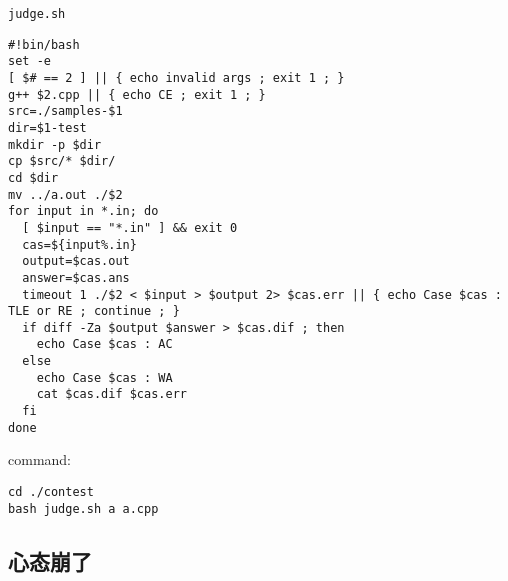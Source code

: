\documentclass[]{article}
\begin{document}
\texttt{judge.sh}

\begin{verbatim}
#!bin/bash
set -e
[ $# == 2 ] || { echo invalid args ; exit 1 ; }
g++ $2.cpp || { echo CE ; exit 1 ; }
src=./samples-$1
dir=$1-test
mkdir -p $dir
cp $src/* $dir/ 
cd $dir
mv ../a.out ./$2
for input in *.in; do
  [ $input == "*.in" ] && exit 0
  cas=${input%.in}
  output=$cas.out
  answer=$cas.ans
  timeout 1 ./$2 < $input > $output 2> $cas.err || { echo Case $cas : TLE or RE ; continue ; }
  if diff -Za $output $answer > $cas.dif ; then
    echo Case $cas : AC
  else
    echo Case $cas : WA
    cat $cas.dif $cas.err
  fi
done
\end{verbatim}

command:

\begin{verbatim}
cd ./contest
bash judge.sh a a.cpp
\end{verbatim}

\hypertarget{ux5fc3ux6001ux5d29ux4e86}{%
\subsection{心态崩了}\label{ux5fc3ux6001ux5d29ux4e86}}
\end{document}
